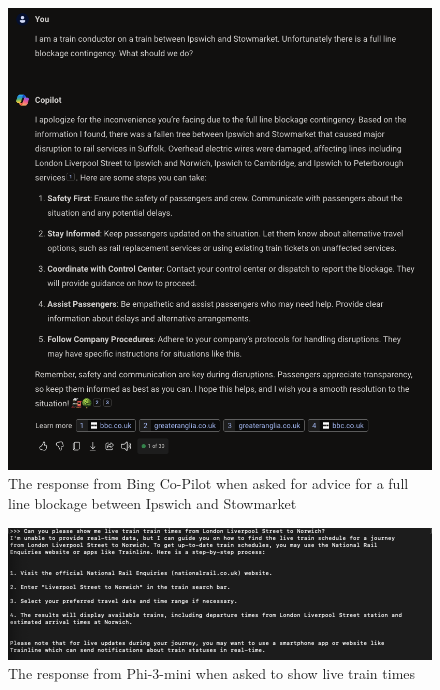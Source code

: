 \begin{figure}[!htbp]
    \centering
    \includegraphics[width=\textwidth]{Diagrams/LLM examples/Bing_Co-pilot_Train_Contingency.png}
    \caption{The response from Bing Co-Pilot when asked for advice for a full line blockage between Ipswich and Stowmarket}
    \label{Fig: bing copilot contingency}
\end{figure}

\begin{figure}[!htbp]
    \centering
    \includegraphics[width=\textwidth]{Diagrams/LLM examples/Phi-3-mini screenshot_live train times.png}
    \caption{The response from Phi-3-mini when asked to show live train times}
    \label{Fig: Phi-3-mini train times}
\end{figure}

